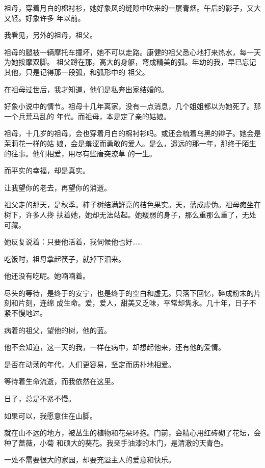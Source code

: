 \documentclass[12pt,a4paper]{article}
\begin{document}
		祖母，穿着月白的棉衬衫，她好象风的缝隙中吹来的一屡青烟。午后的影子，又大又轻。好象许多
	年以前。

		我看见，另外的祖母，祖父。

		祖母的腿被一辆摩托车撞坏，她不可以走路。康健的祖父悉心地打来热水，每一天为她按摩双脚。
	祖父蹲在那，高大的身躯，弯成精美的弧。年幼的我，早已忘记其他，只是记得那一段弧，和弧形中的
	祖父。

		在祖母过世后，我才知道，他们是私奔出家结婚的。

		好象小说中的情节。祖母十几年离家，没有一点消息，几个姐姐都以为她死了。那一个兵荒马乱的
	年代。而祖母，本是定了亲的姑娘。

		祖母，十几岁的祖母，会也穿着月白的棉衬衫吗。或还会梳着乌黑的辫子。她会是茉莉花一样的姑
	娘，会是羞涩而勇敢的爱人。是么，遥远的那一年，那终于陌生的往事。他们相爱，用尽有些唐突潦草
	的一生。

		而平实的幸福，却是真实。\par
		让我望你的老去，再望你的消逝。

		祖父走的那天，是秋季。柿子树结满鲜亮的桔色果实。天，蓝成虚伪。祖母瘫坐在树下，许多人搀
	扶着她，她却无法站起。她瘦弱的身子，那么重那么重了，无处可藏。

		她反复说着：只要他活着，我伺候他也好……\par
		吃饭时，祖母拿起筷子，就掉下泪来。\par
		他还没有吃呢。她喃喃着。

		尽头的等待，是终于的安宁，也是终于的空白和虚无。只落下回忆，碎成粉末的片刻和片刻，连绵
	成生命。爱，爱人，甜美又乏味，平常却隽永。几十年，日子不紧不慢地过。

		病着的祖父，望他的树，他的蓝。\par
		他不会知道，这一天的我，一样在病中，却想起他来，还有他的爱情。\par
		是否在动荡的年代，人们更容易，坚定而质朴地相爱。\par
		等待着生命流逝，而我依然在这里。\par
		日子，总是不紧不慢。

	\endwriting



		如果可以，我愿意住在山脚。

		就在山不远的地方，被丛生的植物和花朵环抱。门前，会精心用红砖砌了花坛，会种了蔷薇，小菊
	和硕大的葵花。我亲手油漆的木门，是清澈的天青色。

		一处不需要很大的家园，却要充溢主人的爱意和快乐。
\end{document}
